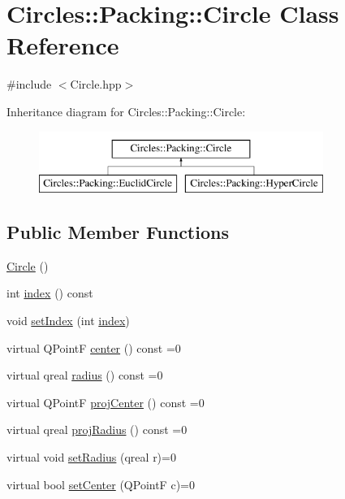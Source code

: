 \hypertarget{class_circles_1_1_packing_1_1_circle}{}\section{Circles\+:\+:Packing\+:\+:Circle Class Reference}
\label{class_circles_1_1_packing_1_1_circle}


{\ttfamily \#include $<$Circle.\+hpp$>$}

Inheritance diagram for Circles\+:\+:Packing\+:\+:Circle\+:\begin{figure}[H]
\begin{center}
\leavevmode
\includegraphics[height=2.000000cm]{class_circles_1_1_packing_1_1_circle}
\end{center}
\end{figure}
\subsection*{Public Member Functions}
\begin{DoxyCompactItemize}
\item 
\hyperlink{class_circles_1_1_packing_1_1_circle_ad1ecfcfc7bf34529c6a6d6c448bf70fe}{Circle} ()
\item 
int \hyperlink{class_circles_1_1_packing_1_1_circle_a426d2e69ceadbbf0d119fd117102a8a9}{index} () const 
\item 
void \hyperlink{class_circles_1_1_packing_1_1_circle_a0377f9826d119b9cbbe7abb142a66f54}{set\+Index} (int \hyperlink{class_circles_1_1_packing_1_1_circle_a426d2e69ceadbbf0d119fd117102a8a9}{index})
\item 
virtual Q\+Point\+F \hyperlink{class_circles_1_1_packing_1_1_circle_a2241ee34969d0c0266948cf1f23fa23a}{center} () const  =0
\item 
virtual qreal \hyperlink{class_circles_1_1_packing_1_1_circle_a3e34226854bcbcbd9e462e1e4fe54005}{radius} () const  =0
\item 
virtual Q\+Point\+F \hyperlink{class_circles_1_1_packing_1_1_circle_a8f410a32d3d9421231512f86fb0d564e}{proj\+Center} () const  =0
\item 
virtual qreal \hyperlink{class_circles_1_1_packing_1_1_circle_a70b927c4a58d1fe7c7576f351ce45784}{proj\+Radius} () const  =0
\item 
virtual void \hyperlink{class_circles_1_1_packing_1_1_circle_a7ed2112528b874aa2cb58854eb844b7c}{set\+Radius} (qreal r)=0
\item 
virtual bool \hyperlink{class_circles_1_1_packing_1_1_circle_a335f807f081d7f97fdea6e6d84cbc46e}{set\+Center} (Q\+Point\+F c)=0
\end{DoxyCompactItemize}
